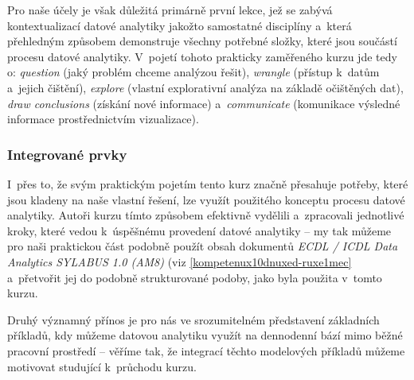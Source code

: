 Pro naše účely je však důležitá primárně první lekce, jež se zabývá kontextualizací datové analytiky jakožto samostatné disciplíny a~která přehledným způsobem demonstruje všechny potřebné složky, které jsou součástí procesu datové analytiky. V~pojetí tohoto prakticky zaměřeného kurzu jde tedy o: \emph{question} (jaký problém chceme analýzou řešit), \emph{wrangle} (přístup k~datům a~jejich čištění), \emph{explore} (vlastní explorativní analýza na základě očištěných dat), \emph{draw conclusions} (získání nové informace) a~\emph{communicate} (komunikace výsledné informace prostřednictvím vizualizace).~\parencite{course2}

\hypertarget{integrovanuxe9-prvky-1}{%
\subsubsection{Integrované prvky}\label{integrovanuxe9-prvky-1}}

I~přes to, že svým praktickým pojetím tento kurz značně přesahuje potřeby, které jsou kladeny na naše vlastní řešení, lze využít použitého konceptu procesu datové analytiky. Autoři kurzu tímto způsobem efektivně vydělili a~zpracovali jednotlivé kroky, které vedou k~úspěšnému provedení datové analytiky -- my tak můžeme pro naši praktickou část podobně použít obsah dokumentů \emph{ECDL / ICDL Data Analytics SYLABUS 1.0 (AM8)} (viz \ref{kompetenux10dnuxed-ruxe1mec} a~přetvořit jej do podobně strukturované podoby, jako byla použita v~tomto kurzu.

Druhý významný přínos je pro nás ve srozumitelném představení základních příkladů, kdy můžeme datovou analytiku využít na dennodenní bází mimo běžné pracovní prostředí -- věříme tak, že integrací těchto modelových příkladů můžeme motivovat studující k~průchodu kurzu.
